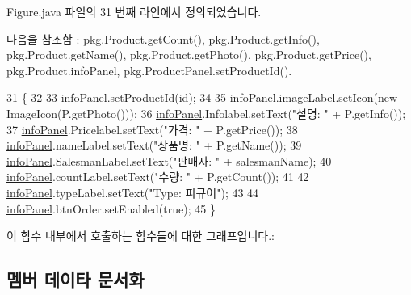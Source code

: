 Figure.\+java 파일의 31 번째 라인에서 정의되었습니다.



다음을 참조함 \+:  pkg.\+Product.\+get\+Count(), pkg.\+Product.\+get\+Info(), pkg.\+Product.\+get\+Name(), pkg.\+Product.\+get\+Photo(), pkg.\+Product.\+get\+Price(), pkg.\+Product.\+info\+Panel, pkg.\+Product\+Panel.\+set\+Product\+Id().


\begin{DoxyCode}
31                                                                 \{
32         
33         \hyperlink{classpkg_1_1_product_a6755de182d9383bc860fa44a8a01789d}{infoPanel}.\hyperlink{classpkg_1_1_product_panel_ae1cb96da7cd48c10f53c8c9f8e44d4d3}{setProductId}(\textcolor{keywordtype}{id});
34         
35         \hyperlink{classpkg_1_1_product_a6755de182d9383bc860fa44a8a01789d}{infoPanel}.imageLabel.setIcon(\textcolor{keyword}{new} ImageIcon(P.getPhoto()));
36         \hyperlink{classpkg_1_1_product_a6755de182d9383bc860fa44a8a01789d}{infoPanel}.Infolabel.setText(\textcolor{stringliteral}{"설명: "} + P.getInfo());
37         \hyperlink{classpkg_1_1_product_a6755de182d9383bc860fa44a8a01789d}{infoPanel}.Pricelabel.setText(\textcolor{stringliteral}{"가격: "} + P.getPrice());
38         \hyperlink{classpkg_1_1_product_a6755de182d9383bc860fa44a8a01789d}{infoPanel}.nameLabel.setText(\textcolor{stringliteral}{"상품명: "} + P.getName());
39         \hyperlink{classpkg_1_1_product_a6755de182d9383bc860fa44a8a01789d}{infoPanel}.SalesmanLabel.setText(\textcolor{stringliteral}{"판매자: "} + salesmanName);
40         \hyperlink{classpkg_1_1_product_a6755de182d9383bc860fa44a8a01789d}{infoPanel}.countLabel.setText(\textcolor{stringliteral}{"수량: "} + P.getCount());
41         
42         \hyperlink{classpkg_1_1_product_a6755de182d9383bc860fa44a8a01789d}{infoPanel}.typeLabel.setText(\textcolor{stringliteral}{"Type: 피규어"});
43         
44         \hyperlink{classpkg_1_1_product_a6755de182d9383bc860fa44a8a01789d}{infoPanel}.btnOrder.setEnabled(\textcolor{keyword}{true});
45     \}
\end{DoxyCode}


이 함수 내부에서 호출하는 함수들에 대한 그래프입니다.\+:




\subsection{멤버 데이타 문서화}
